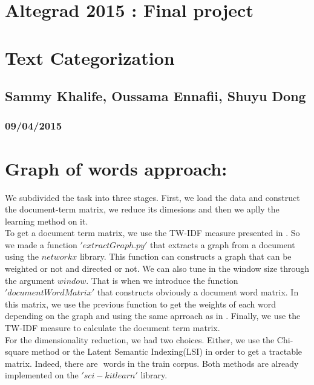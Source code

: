 
\geometry{hmargin=2.5cm,vmargin=2cm}   


\begin{center}

\section*{Altegrad 2015 : Final project}
\section*{Text Categorization}
\subsection*{Sammy Khalife, Oussama Ennafii, Shuyu Dong}
\subsubsection*{09/04/2015}

\end{center}

\section{Graph of words approach:}

We subdivided the task into three stages. First, we load the data and construct the document-term matrix, we reduce its dimesions and then we aplly the learning method on it.\\

To get a document term matrix, we use the TW-IDF measure presented in \cite{rousseau2013graph}. So we made a function $'extractGraph.py'$ that extracts a graph from a document using the $networkx$ library. This function can constructs a graph that can be weighted or not and directed or not. We can also tune in the window size through the argument $window$. That is when we introduce the function $'documentWordMatrix'$ that constructs obviously a document word matrix. In this matrix, we use the previous function to get the weights of each word depending on the graph and using the same aprroach as in \cite{rousseau2013graph}. Finally, we use the TW-IDF measure to calculate the document term matrix.\\

For the dimensionality reduction, we had two choices. Either, we use the Chi-square method or the Latent Semantic Indexing(LSI) in order to get a tractable matrix. Indeed, there are $ $ words in the train corpus. Both methods are already implemented on the $'sci-kit learn'$ library. \\

